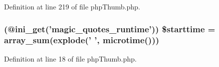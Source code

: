 \-Definition at line 219 of file php\-Thumb.\-php.

\hypertarget{php_thumb_8php_a21d98a10797e2b2d5b826d42a0fc9cbf}{
\subsubsection[{\$starttime}]{ (@ini\-\_\-get('magic\-\_\-quotes\-\_\-runtime')) \$starttime = array\-\_\-sum(explode(' ', microtime()))}}\label{php_thumb_8php_a21d98a10797e2b2d5b826d42a0fc9cbf}


\-Definition at line 18 of file php\-Thumb.\-php.

